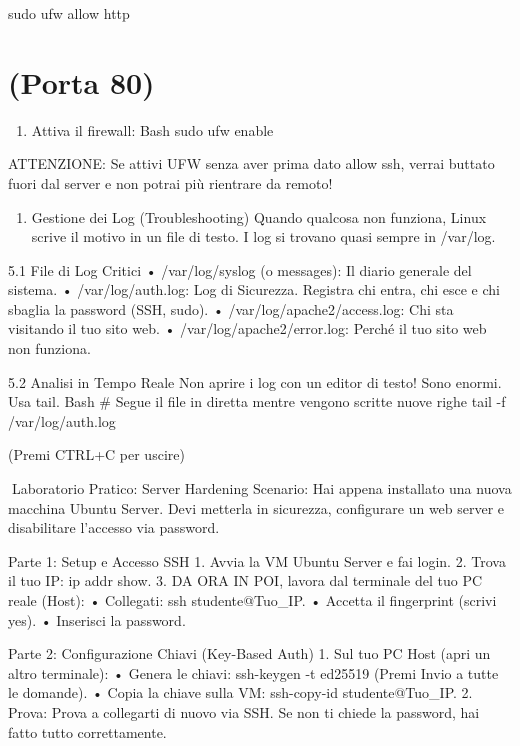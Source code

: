 \documentclass[11pt,a4paper]{article}
\providecommand{\tightlist}{%
  \setlength{\itemsep}{0pt}\setlength{\parskip}{0pt}}
\begin{document}
sudo ufw allow http

\section{(Porta 80)}\label{porta-80}

\begin{enumerate}
\def\labelenumi{\arabic{enumi}.}
\setcounter{enumi}{2}
\tightlist
\item
  Attiva il firewall: Bash sudo ufw enable
\end{enumerate}

ATTENZIONE: Se attivi UFW senza aver prima dato allow ssh, verrai
buttato fuori dal server e non potrai più rientrare da remoto!

\begin{enumerate}
\def\labelenumi{\arabic{enumi}.}
\setcounter{enumi}{4}
\tightlist
\item
  Gestione dei Log (Troubleshooting) Quando qualcosa non funziona, Linux
  scrive il motivo in un file di testo. I log si trovano quasi sempre in
  /var/log.
\end{enumerate}

5.1 File di Log Critici • /var/log/syslog (o messages): Il diario
generale del sistema. • /var/log/auth.log: Log di Sicurezza. Registra
chi entra, chi esce e chi sbaglia la password (SSH, sudo). •
/var/log/apache2/access.log: Chi sta visitando il tuo sito web. •
/var/log/apache2/error.log: Perché il tuo sito web non funziona.

5.2 Analisi in Tempo Reale Non aprire i log con un editor di testo! Sono
enormi. Usa tail. Bash \# Segue il file in diretta mentre vengono
scritte nuove righe tail -f /var/log/auth.log

(Premi CTRL+C per uscire)

Laboratorio Pratico: Server Hardening Scenario: Hai appena installato
una nuova macchina Ubuntu Server. Devi metterla in sicurezza,
configurare un web server e disabilitare l'accesso via password.

Parte 1: Setup e Accesso SSH 1. Avvia la VM Ubuntu Server e fai login.
2. Trova il tuo IP: ip addr show. 3. DA ORA IN POI, lavora dal terminale
del tuo PC reale (Host): • Collegati: ssh studente@Tuo\_IP. • Accetta il
fingerprint (scrivi yes). • Inserisci la password.

Parte 2: Configurazione Chiavi (Key-Based Auth) 1. Sul tuo PC Host (apri
un altro terminale): • Genera le chiavi: ssh-keygen -t ed25519 (Premi
Invio a tutte le domande). • Copia la chiave sulla VM: ssh-copy-id
studente@Tuo\_IP. 2. Prova: Prova a collegarti di nuovo via SSH. Se non
ti chiede la password, hai fatto tutto correttamente.
\end{document}
